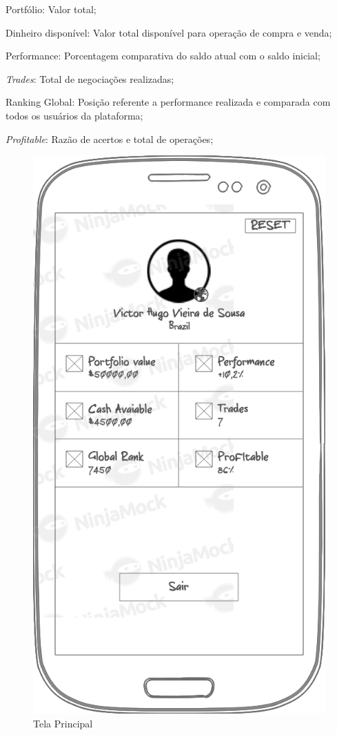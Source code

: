 \begin{lista}
  \item Portfólio: Valor total;
  \item Dinheiro disponível: Valor total disponível para operação de compra e venda;
  \item Performance: Porcentagem comparativa do saldo atual com o saldo inicial;
  \item \textit{Trades}: Total de negociações realizadas;
  \item Ranking Global: Posição referente a performance realizada e comparada com todos os usuários da plataforma;
  \item \textit{Profitable}: Razão de acertos e total de operações;
\end{lista}

\begin{figure}[H]
  \caption{\label{fig:mock_login}Tela Principal}
  \centering
  \includegraphics[scale=0.4]{imagens/mocks/profile.png}
\end{figure}


